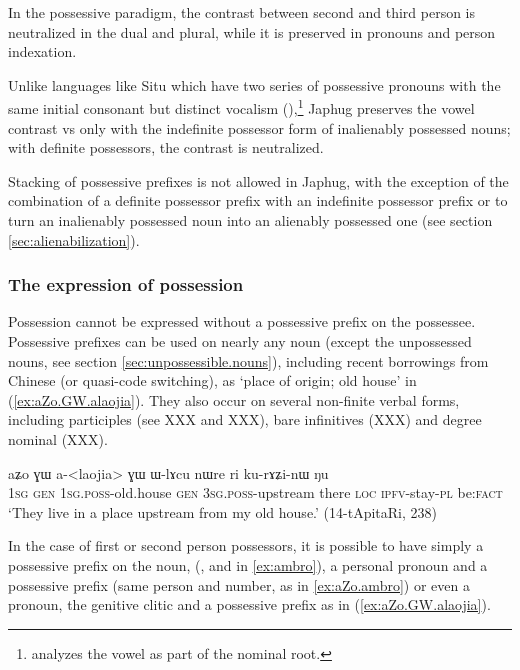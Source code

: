 In the possessive paradigm, the contrast between second and third person is neutralized in the dual and plural, while it is preserved in pronouns and person indexation.

Unlike languages like Situ which have two series of possessive pronouns with the same initial consonant but distinct vocalism (\citealt[168-169]{linxr93jiarongen}),\footnote{\citet[118-119]{prins16kyomkyo} analyzes the vowel as part of the nominal root.} Japhug preserves the vowel contrast  vs  only with the indefinite possessor form of inalienably possessed nouns; with definite possessors, the contrast is neutralized.

Stacking of possessive prefixes is not allowed in Japhug, with the exception of the combination of a definite possessor prefix with an indefinite possessor prefix  or  to turn an inalienably possessed noun into an alienably possessed one (see section \ref{sec:alienabilization}).

\subsubsection{The expression of possession}
Possession cannot be expressed without a possessive prefix on the possessee. Possessive prefixes can be used on nearly any noun (except the unpossessed nouns, see section \ref{sec:unpossessible.nouns}), including recent borrowings from Chinese (or quasi-code switching), as   `place of origin; old house' in (\ref{ex:aZo.GW.alaojia}). They also occur on several non-finite verbal forms, including participles (see XXX and XXX), bare infinitives (XXX) and degree nominal (XXX).

\begin{exe}
\ex \label{ex:aZo.GW.alaojia}
\gll
aʑo ɣɯ a-<laojia> ɣɯ ɯ-lɤcu nɯre ri ku-rɤʑi-nɯ ŋu \\
\textsc{1sg} \textsc{gen} \textsc{1sg.poss}-old.house \textsc{gen} \textsc{3sg.poss}-upstream there \textsc{loc} \textsc{ipfv}-stay-\textsc{pl} be:\textsc{fact} \\
\glt `They live in a place upstream from my old house.' (14-tApitaRi, 238)
\end{exe}

In the case of first or second person possessors, it is possible to have simply a possessive prefix on the noun, (,  and  in \ref{ex:ambro}), a personal pronoun and a possessive prefix (same person and number, as in \ref{ex:aZo.ambro}) or even a pronoun, the genitive clitic  and a possessive prefix as in (\ref{ex:aZo.GW.alaojia}).

